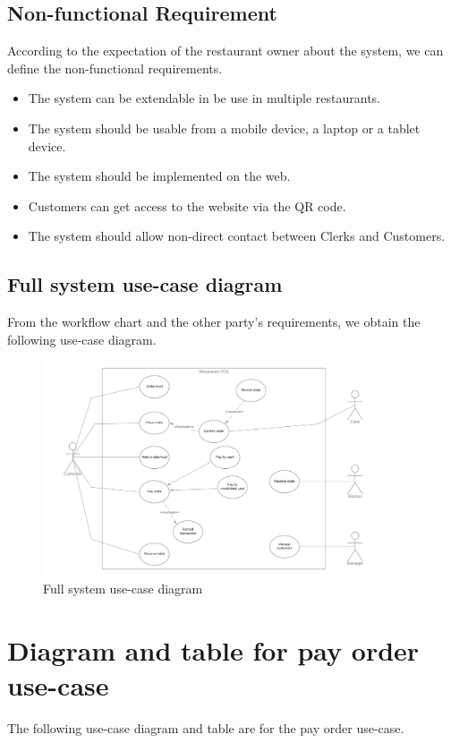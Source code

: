 \subsection{Non-functional Requirement}
According to the expectation of the restaurant owner about the system, we can define the non-functional requirements.
\begin{itemize}
  \item The system can be extendable in be use in multiple restaurants.
  \item The system should be usable from a mobile device, a laptop or a tablet device.
  \item The system should be implemented on the web.
  \item Customers can get access to the website via the QR code.
  \item The system should allow non-direct contact between Clerks and Customers.
\end{itemize}

\subsection{Full system use-case diagram}
From the workflow chart and the other party's requirements, we obtain the following use-case diagram.

\begin{figure}[H]
  \centering
  \includegraphics[width=0.9\textwidth]{./assets/t1/PieceOfSale.png}
  \caption{Full system use-case diagram}
\end{figure}

\newpage

\section{Diagram and table for pay order use-case}
The following use-case diagram and table are for the pay order use-case.

